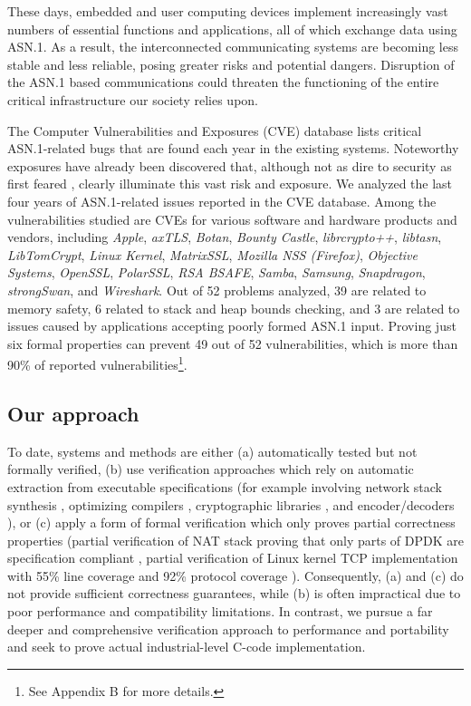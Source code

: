\documentclass[10p,conference]{IEEEtran}
\begin{document}
These days, embedded and user computing devices  implement increasingly vast numbers of essential functions and applications, all of which
exchange data using ASN.1. As a result, the interconnected communicating
systems are becoming less stable and less reliable, posing greater risks and
potential dangers. Disruption of the ASN.1 based communications
could threaten the functioning of the entire critical infrastructure our
society relies upon.


The Computer Vulnerabilities and Exposures (CVE) database \cite{CVE}
lists critical ASN.1-related bugs that are found each year in the existing
systems. Noteworthy exposures have already been discovered 
\cite{OpenSSLMemoryCorruption} that, although not as dire to security
as first feared \cite{ASN1Flaw}, clearly illuminate this vast risk and exposure. We analyzed the last four years of
ASN.1-related issues reported in the CVE database. %
Among the vulnerabilities studied
are CVEs for various software and hardware products and vendors,
including \textit{Apple}, \textit{axTLS}, \textit{Botan},
\textit{Bounty Castle}, \textit{librcrypto++}, \textit{libtasn},
\textit{LibTomCrypt}, \textit{Linux Kernel}, \textit{MatrixSSL},
\textit{Mozilla NSS (Firefox)}, \textit{Objective Systems},
\textit{OpenSSL}, \textit{PolarSSL}, \textit{RSA BSAFE},
\textit{Samba}, \textit{Samsung}, \textit{Snapdragon},
\textit{strongSwan}, and \textit{Wireshark}. Out of 52 problems analyzed, 39 are related to memory safety, 6 related to
stack and heap bounds checking, and 3 are related to issues caused by
applications accepting poorly formed ASN.1 input. Proving just
six formal properties can prevent 49 out of 52
vulnerabilities, which is more than 90\% of reported
vulnerabilities\footnote{See Appendix B for more details.}.

\subsection{Our approach}
\label{sec:approach}
To date, systems and methods are either (a) automatically tested but not
formally verified, (b) use verification approaches which rely on
automatic extraction from executable specifications (for example
involving network stack synthesis \cite{VNSSforSel4}, optimizing compilers
\cite{CompCert}, cryptographic libraries \cite{HACL}, and
encoder/decoders \cite{Narcissus}), or (c) apply a form of formal
verification which only proves partial correctness properties (partial
verification of NAT stack proving that only parts of DPDK are specification
compliant \cite{NAT}, partial verification of Linux kernel TCP
implementation with 55\% line coverage and 92\% protocol coverage
\cite{NSDI}). Consequently, (a) and (c) do not provide sufficient
correctness guarantees, while (b) is often impractical due to poor
performance and compatibility limitations. In contrast, we pursue a
far deeper and comprehensive verification approach to performance and
portability and seek to prove actual industrial-level C-code
implementation.
\end{document}
